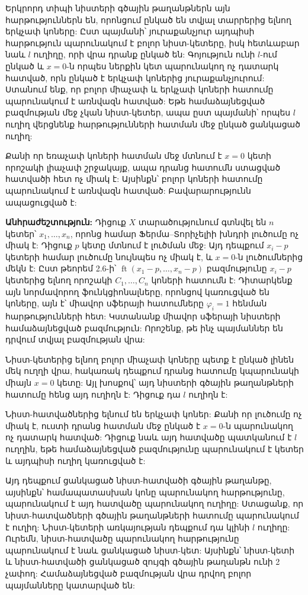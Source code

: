 \documentclass[12pt,a4paper]{article}
\numberwithin{equation}{section}
\numberwithin{figure}{section}
\begin{document}
Երկրորդ տիպի նիստերի գծային թաղանթներն այն հարթություններն են, որոնցում ընկած են տվյալ տարրերից ելնող երկչափ կոները: Ըստ պայմանի՝ յուրաքանչյուր այդպիսի հարթություն պարունակում է բոլոր նիստ-կետերը, իսկ հետևաբար նաև $l$ ուղիղը, որի վրա դրանք ընկած են: Գոյություն ունի $l$-ում ընկած և $x = 0$-ն որպես ներքին կետ պարունակող ոչ դատարկ հատված, որն ընկած է երկչափ կոներից յուրաքանչյուրում: Ստանում ենք, որ բոլոր միաչափ և երկչափ կոների հատումը պարունակում է առնվազն հատված: Եթե համաձայնեցված բազմության մեջ չկան նիստ-կետեր, ապա ըստ պայմանի՝ որպես $l$ ուղիղ վերցնենք հարթությունների հատման մեջ ընկած ցանկացած ուղիղ:

Քանի որ եռաչափ կոների հատման մեջ մտնում է $x = 0$ կետի որոշակի լիաչափ շրջակայք, ապա դրանց հատումն ստացված հատվածի հետ ոչ միակ է: Այսինքն՝ բոլոր կոների հատումը պարունակում է առնվազն հատված: Բավարարությունն ապացուցված է:

\textbf{Անհրաժեշտություն:} Դիցուք $X$ տարածությունում գտնվել են $n$ կետեր՝ $x_1, \dots, x_n$, որոնց համար Ֆերմա--Տորիչելիի խնդրի լուծումը ոչ միակ է: Դիցուք $p$ կետը մտնում է լուծման մեջ: Այդ դեպքում $x_i - p$ կետերի համար լուծումը նույնպես ոչ միակ է, և $x = 0$-ն լուծումներից մեկն է: Ըստ թեորեմ 2.6-ի՝ $\operatorname{ft}(x_1 - p, \dots, x_n - p)$ բազմությունը $x_i - p$ կետերից ելնող որոշակի $C_1, \dots, C_n$ կոների հատումն է: Դիտարկենք այն նորմավորող ֆունկցիոնալները, որոնցով կառուցված են կոները, այն է՝ միավոր սֆերայի հատումները $\varphi_i = 1$ հենման հարթությունների հետ: Կստանանք միավոր սֆերայի նիստերի համաձայնեցված բազմություն: Որոշենք, թե ինչ պայմաններ են դրվում տվյալ բազմության վրա:

Նիստ-կետերից ելնող բոլոր միաչափ կոները պետք է ընկած լինեն մեկ ուղղի վրա, հակառակ դեպքում դրանց հատումը կպարունակի միայն $x = 0$ կետը: Այլ խոսքով՝ այդ նիստերի գծային թաղանթների հատումը հենց այդ ուղիղն է: Դիցուք դա $l$ ուղիղն է:

Նիստ-հատվածներից ելնում են երկչափ կոներ: Քանի որ լուծումը ոչ միակ է, ուստի դրանց հատման մեջ ընկած է $x = 0$-ն պարունակող ոչ դատարկ հատված: Դիցուք նաև այդ հատվածը պատկանում է $l$ ուղղին, եթե համաձայնեցված բազմությունը պարունակում է կետեր և այդպիսի ուղիղ կառուցված է:

Այդ դեպքում ցանկացած նիստ-հատվածի գծային թաղանթը, այսինքն՝ համապատասխան կոնը պարունակող հարթությունը, պարունակում է այդ հատվածը պարունակող ուղիղը: Ստացանք, որ նիստ-հատվածների գծային թաղանթների հատումը պարունակում է ուղիղ: Նիստ-կետերի առկայության դեպքում դա կլինի $l$ ուղիղը: Ուրեմն, նիստ-հատվածը պարունակող հարթությունը պարունակում է նաև ցանկացած նիստ-կետ: Այսինքն՝ նիստ-կետի և նիստ-հատվածի ցանկացած զույգի գծային թաղանթն ունի 2 չափող: Համաձայնեցված բազմության վրա դրվող բոլոր պայմանները կատարված են: 
\end{document}
